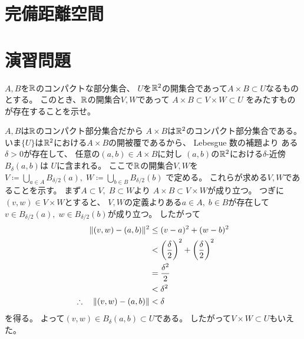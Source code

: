 \documentclass[report]{jlreq}
\begin{document}
%
\section{完備距離空間}

%
\section{演習問題}

\begin{problem}[東大数理 2007A]
    $A, B$を$\mathbb{R}$のコンパクトな部分集合、
    $U$を$\mathbb{R}^2$の開集合であって$A \times B \subset U$なるものとする。
    このとき、$\mathbb{R}$の開集合$V, W$であって
    $A \times B \subset V \times W \subset U$
    をみたすものが存在することを示せ。
\end{problem}

\begin{answer}
    $A, B$は$\mathbb{R}$のコンパクト部分集合だから
    $A \times B$は$\mathbb{R}^2$のコンパクト部分集合である。
    いま$\{ U \}$は$\mathbb{R}^2$における$A \times B$の開被覆であるから、
    Lebesgue 数の補題より
    ある$\delta > 0$が存在して、
    任意の$(a, b) \in A \times B$に対し
    $(a, b)$の$\mathbb{R}^2$における$\delta$-近傍$B_\delta (a, b)$は
    $U$に含まれる。
    ここで$\mathbb{R}$の開集合$V, W$を
    $V \coloneqq \bigcup_{a \in A} B_{\delta / 2}(a), \;
        W \coloneqq \bigcup_{b \in B} B_{\delta / 2}(b)$
    で定める。
    これらが求める$V, W$であることを示す。
    まず$A \subset V, \; B \subset W$より
    $A \times B \subset V \times W$が成り立つ。
    つぎに$(v, w) \in V \times W$とすると、
    $V, W$の定義よりある$a \in A, \; b \in B$が存在して
    $v \in B_{\delta / 2}(a), \; w \in B_{\delta / 2}(b)$が成り立つ。
    したがって
    \begin{alignat}{1}
        \| (v, w) - (a, b) \|^2
            &\le (v - a)^2 + (w - b)^2 \\
            &< \left({\frac{\delta}{2}}\right)^2 + \left({\frac{\delta}{2}}\right)^2 \\
            &= \frac{\delta^2}{2} \\
            &< \delta^2 \\
        \therefore \quad \| (v, w) - (a, b) \|
            &< \delta
    \end{alignat}
    を得る。
    よって$(v, w) \in B_\delta (a, b) \subset U$である。
    したがって$V \times W \subset U$もいえた。
\end{answer}
\end{document}

